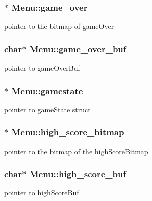 \subsubsection[{\texorpdfstring{game\+\_\+over}{game_over}}]{$\ast$ Menu\+::game\+\_\+over}\hypertarget{structMenu_a72d373e429b2128f377da31eb0a5883f}{}\label{structMenu_a72d373e429b2128f377da31eb0a5883f}
pointer to the bitmap of game\+Over 
\subsubsection[{\texorpdfstring{game\+\_\+over\+\_\+buf}{game_over_buf}}]{\setlength{\rightskip}{0pt plus 5cm}char$\ast$ Menu\+::game\+\_\+over\+\_\+buf}\hypertarget{structMenu_aff9f3dbaf009458436de8073c75e0add}{}\label{structMenu_aff9f3dbaf009458436de8073c75e0add}
pointer to game\+Over\+Buf 
\subsubsection[{\texorpdfstring{gamestate}{gamestate}}]{$\ast$ Menu\+::gamestate}\hypertarget{structMenu_a8f37305b3ff2904bfb9cb1f91a9b7ce1}{}\label{structMenu_a8f37305b3ff2904bfb9cb1f91a9b7ce1}
pointer to game\+State struct 
\subsubsection[{\texorpdfstring{high\+\_\+score\+\_\+bitmap}{high_score_bitmap}}]{$\ast$ Menu\+::high\+\_\+score\+\_\+bitmap}\hypertarget{structMenu_ad58d6c50745792c796c8530eaf0e5118}{}\label{structMenu_ad58d6c50745792c796c8530eaf0e5118}
pointer to the bitmap of the high\+Score\+Bitmap 
\subsubsection[{\texorpdfstring{high\+\_\+score\+\_\+buf}{high_score_buf}}]{\setlength{\rightskip}{0pt plus 5cm}char$\ast$ Menu\+::high\+\_\+score\+\_\+buf}\hypertarget{structMenu_a2852ccdfeadd1fa197b26256aac48464}{}\label{structMenu_a2852ccdfeadd1fa197b26256aac48464}
pointer to high\+Score\+Buf 
